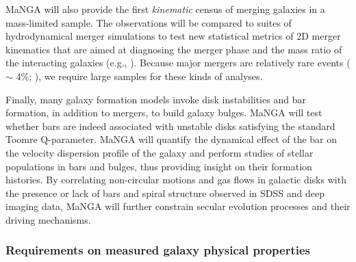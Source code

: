 \documentclass[preprint,11pt]{aastex}
\begin{document}
MaNGA will also provide the first {\em kinematic} census of merging
galaxies in a mass-limited sample.  The observations will be compared
to suites of hydrodynamical merger simulations to test new statistical
metrics of 2D merger kinematics that are aimed at diagnosing the
merger phase and the mass ratio of the interacting galaxies (e.g.,
\citealt{bellocchi2012}).  Because major mergers are relatively rare events
($\sim$ 4\%; \citealt{bundy2009}), we require large samples
for these kinds of analyses.

Finally, many galaxy formation models invoke disk instabilities and
bar formation, in addition to mergers, to build galaxy bulges. 
 MaNGA will test whether bars are indeed associated with unstable disks
satisfying the standard Toomre Q-parameter. 
MaNGA will quantify the dynamical effect of the bar on the 
velocity dispersion profile of the galaxy and perform studies of 
stellar populations in bars and bulges, thus providing 
insight on their formation histories.  By correlating non-circular 
motions and gas flows in galactic disks with the presence or lack 
of bars and spiral structure observed in SDSS and deep imaging data, 
MaNGA will further constrain secular evolution processes and their 
driving mechanisms.

\subsubsection{Requirements on measured galaxy physical properties}
\end{document}
